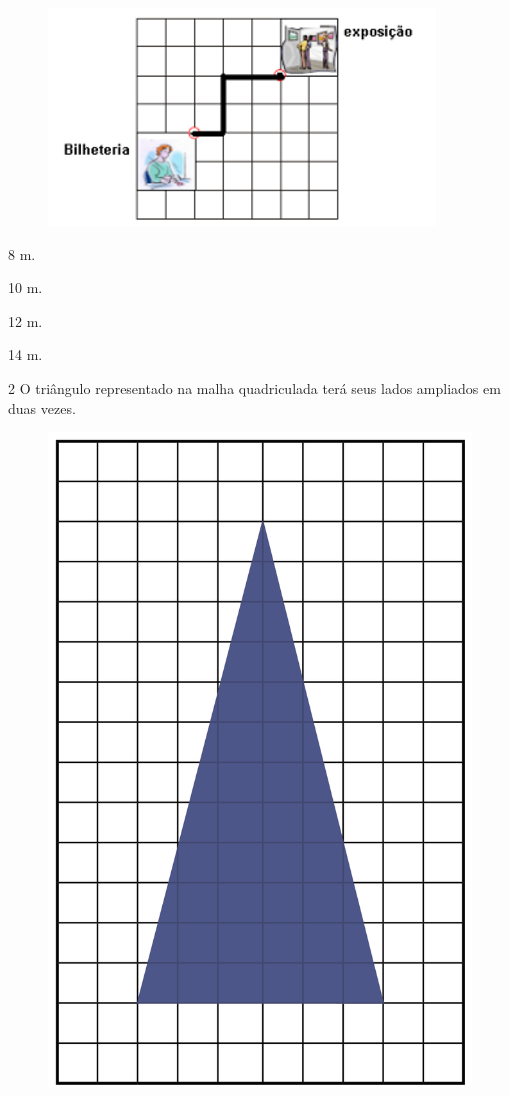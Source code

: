\begin{figure}[htpb!]
\centering
\includegraphics[width=\textwidth]{./imgs/mat8.png}
\end{figure}

\begin{multicols}{2}
\begin{escolha}
\item
  8 m.
\item
  10 m.
\item
  12 m.
\item
  14 m.
\end{escolha}
\end{multicols}


\pagebreak
\num{2} O triângulo representado na malha quadriculada terá seus lados ampliados em duas vezes.

\begin{figure}[htpb!]
\centering
\includegraphics[width=.6\textwidth]{../ilustracoes/MAT5/SAEB_5ANO_MAT_figura47.png}
\end{figure}

